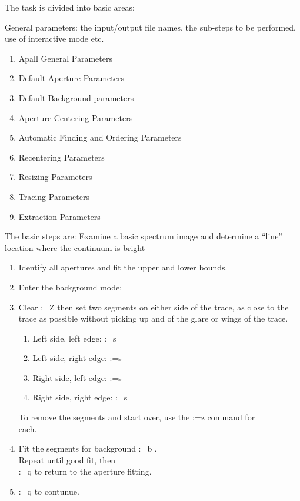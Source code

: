 \documentclass[letter,11pt,oneside]{article}
\makeatletter
\newcommand\llbox[1]{%
  \@tfor\@ii:=#1\do{%
    {\color{verbcolor}\Ovalbox{\strut\@ii}}%
  }%
}
\makeatother
\begin{document}
The task is divided into basic areas:

General parameters: the input/output file names, the sub-steps to be
performed, use of interactive mode etc.

\vspace{-.15cm}
\begin{enumerate}\addtolength{\itemsep}{-0.5\baselineskip}
   \item   Apall General Parameters
   \item   Default Aperture Parameters
   \item   Default Background parameters
   \item   Aperture Centering Parameters
   \item   Automatic Finding and Ordering Parameters
   \item   Recentering Parameters
   \item   Resizing Parameters
   \item   Tracing Parameters
   \item   Extraction Parameters
\end{enumerate}

The basic steps are:
   Examine a basic spectrum image and determine a ``line'' location where
   the continuum is bright

\vspace{-.15cm}
\begin{enumerate}\addtolength{\itemsep}{-0.5\baselineskip}
   \item   Identify all apertures and fit the upper and lower bounds.
   \item   Enter the background mode:
   \item   Clear \llbox{Z} then set two segments on either side of the trace,
      as close to the trace as possible without picking up and of the glare
      or wings of the trace.

\vspace{-.15cm}
\begin{enumerate}\addtolength{\itemsep}{-0.5\baselineskip}
   \item   Left side, left edge:\llbox{s}
   \item   Left side, right edge:\llbox{s}
   \item   Right side, left edge:\llbox{s}
   \item   Right side, right edge:\llbox{s}
\end{enumerate}


      To remove the segments and start over, use the \llbox{z} command for\\
      each.
   
   \item   Fit the segments for background \llbox{b}. \\
         Repeat until good fit, then\\
      \llbox{q} to return to the aperture fitting.
   \item   \llbox{q} to contunue.
\end{enumerate}
\end{document}

